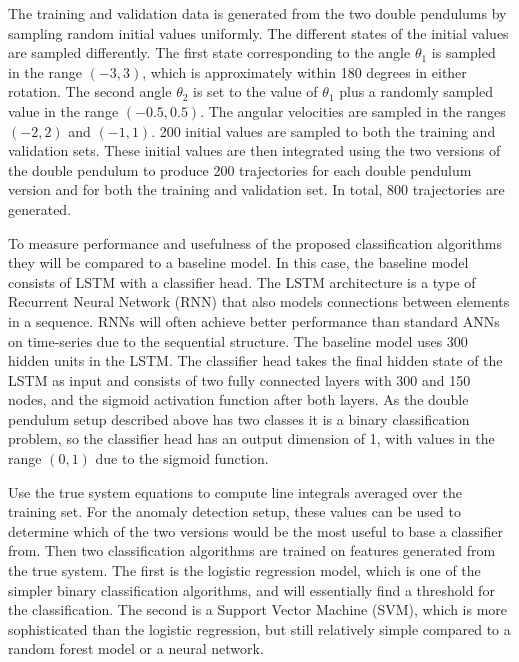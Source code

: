 \documentclass[12pt,a4paper]{book}
\begin{document}
The training and validation data is generated from the two double pendulums by sampling random initial values uniformly. The different states of the initial values are sampled differently. The first state corresponding to the angle $\theta_1$ is sampled in the range $(-3 , 3)$, which is approximately within 180 degrees in either rotation. The second angle $\theta_2$ is set to the value of $\theta_1$ plus a randomly sampled value in the range $(-0.5, 0.5)$. The angular velocities are sampled in the ranges $(-2, 2)$ and $(-1, 1)$. 200 initial values are sampled to both the training and validation sets. These initial values are then integrated using the two versions of the double pendulum to produce 200 trajectories for each double pendulum version and for both the training and validation set. In total, 800 trajectories are generated.

To measure performance and usefulness of the proposed classification algorithms they will be compared to a baseline model. In this case, the baseline model consists of LSTM with a classifier head. The LSTM architecture is a type of Recurrent Neural Network (RNN) that also models connections between elements in a sequence. RNNs will often achieve better performance than standard ANNs on time-series due to the sequential structure. The baseline model uses 300 hidden units in the LSTM. The classifier head takes the final hidden state of the LSTM as input and consists of two fully connected layers with 300 and 150 nodes, and the sigmoid activation function after both layers. As the double pendulum setup described above has two classes it is a binary classification problem, so the classifier head has an output dimension of 1, with values in the range $(0, 1)$ due to the sigmoid function.

Use the true system equations to compute line integrals averaged over the training set. For the anomaly detection setup, these values can be used to determine which of the two versions would be the most useful to base a classifier from. Then two classification algorithms are trained on features generated from the true system. The first is the logistic regression model, which is one of the simpler binary classification algorithms, and will essentially find a threshold for the classification. The second is a Support Vector Machine (SVM), which is more sophisticated than the logistic regression, but still relatively simple compared to a random forest model or a neural network.
\end{document}
